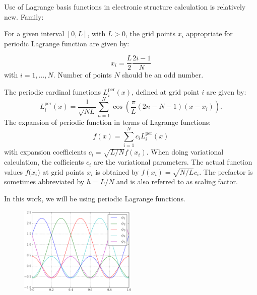Use of Lagrange basis functions in electronic structure calculation is relatively new.
Family:

For a given interval $[0,L]$, with $L>0$, the grid points $x_{i}$
appropriate for periodic Lagrange function are given by:

\begin{equation}
x_{i}=\frac{L}{2}\frac{2i-1}{N}
\end{equation}
with $i=1,\ldots,N$. Number of points $N$ should be an odd number.

The periodic cardinal functions $L_{i}^{\mathrm{per}}(x)$, defined
at grid point $i$ are given by:
\begin{equation}
L_{i}^{\mathrm{per}}(x)=\frac{1}{\sqrt{NL}}\sum_{n=1}^{N}\cos\left(\frac{\pi}{L}(2n-N-1)(x-x_{i})\right).
\label{eq:LF_p_1d}
\end{equation}
The expansion of periodic function in terms of Lagrange functions:
\begin{equation}
f(x)=\sum_{i=1}^{N}c_{i}L_{i}^{\mathrm{per}}(x)
\end{equation}
with expansion coefficients $c_{i}=\sqrt{L/N}f(x_{i})$. When doing
variational calculation, the cofficients $c_{i}$ are the variational
parameters. The actual function values $f(x_{i}$) at grid points
$x_{i}$ is obtained by $f(x_{i})=\sqrt{N/L}c_{i}$. The prefactor
is sometimes abbreviated by $h=L/N$ and is also referred to as scaling
factor.

In this work, we will be using periodic Lagrange functions.

\begin{figure}
\includegraphics[width=0.5\textwidth]{images/plot_LF_p_N_5.pdf}
\end{figure}


